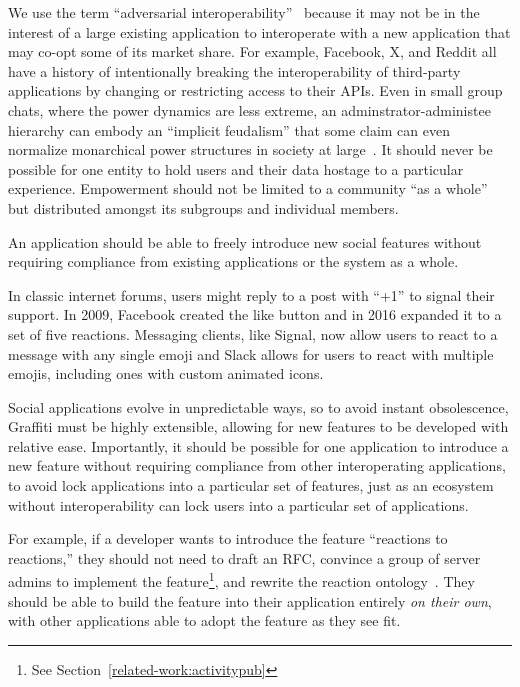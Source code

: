 We use the term ``adversarial interoperability''~\cite{adversarialinterop} because it may not be in the
interest of a large existing application to interoperate with a new application that may co-opt some of its market share.
For example, Facebook, X, and Reddit all have a history of intentionally breaking
the interoperability of third-party applications by changing or restricting access to their APIs.
Even in small group chats, where the power dynamics are less extreme,
an adminstrator-administee hierarchy
can embody an ``implicit feudalism'' that some claim can even
normalize monarchical power structures in society at large~\cite{governablespaces}.
It should never be possible for one entity to hold users
and their data hostage to a particular experience.
Empowerment should not be limited to a community ``as a whole'' but
distributed amongst its subgroups and individual members.

\begin{requirement}
\label{requirements:autonomous-extensibility}
    An application should be able to freely introduce new social features without requiring compliance from existing applications or the system as a whole.
\end{requirement}

In classic internet forums, users might reply to a post with ``+1'' to signal their support.
In 2009, Facebook created the like button and in 2016 expanded it to a set of five reactions.
Messaging clients, like Signal, now allow users to react to a message with any single emoji and
Slack allows for users to react with multiple emojis, including ones with custom animated icons.

Social applications evolve in unpredictable ways,
so to avoid instant obsolescence, Graffiti must be highly extensible,
allowing for new features
to be developed with relative ease.
Importantly, it should be possible for one application to introduce a new feature
without requiring compliance from other interoperating applications, to avoid
lock applications into a particular set of features,
just as an ecosystem without interoperability can lock users into a
particular set of applications.

For example, if a developer wants to introduce the feature
``reactions to reactions,'' they should not need to draft an RFC,
convince a group of server admins to implement the feature\footnote{
    See Section~\ref{related-work:activitypub}
},
and rewrite the reaction ontology~\cite{ecosystemmoving, herdingdnscamel, semanticwebtwodecades}.
They should be able to build the feature into their application
entirely \emph{on their own}, with other applications able to adopt the
feature as they see fit.

